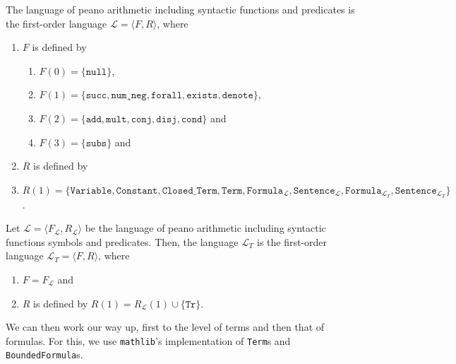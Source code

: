 \begin{definition}\label{def:l}
    \leanok
    The language of peano arithmetic including syntactic functions and predicates is the first-order language $\mathcal{L} = \langle F, R \rangle$, where
    \begin{enumerate}
        \item $F$ is defined by
        \begin{enumerate}
            \item $F(0) = \{\texttt{null}\}$,
            \item $F(1) = \{\texttt{succ},\texttt{num}¸\texttt{neg},\texttt{forall},\texttt{exists},\texttt{denote}\}$,
            \item $F(2) = \{\texttt{add},\texttt{mult},\texttt{conj},\texttt{disj},\texttt{cond}\}$ and
            \item $F(3) = \{\texttt{subs}\}$ and 
        \end{enumerate}
        \item $R$ is defined by \item $R(1) = \{\texttt{Variable},\texttt{Constant},\texttt{Closed\_Term},\texttt{Term},\texttt{Formula}_{\mathcal{L}}, \texttt{Sentence}_{\mathcal{L}},\texttt{Formula}_{\mathcal{L}_T},\texttt{Sentence}_{\mathcal{L}_T}\}$.
    \end{enumerate}
\end{definition} 

\begin{definition}\label{def:lt}
    \leanok
    Let $\mathcal{L} = \langle F_{\mathcal{L}},R_{\mathcal{L}} \rangle$ be the language of peano arithmetic including syntactic functions symbols and predicates. Then, the language $\mathcal{L}_T$ is the first-order language $\mathcal{L}_T = \langle F, R \rangle$, where
    \begin{enumerate}
        \item $F = F_{\mathcal{L}}$ and
        \item $R$ is defined by $R(1) = R_{\mathcal{L}}(1) \cup \{\texttt{Tr}\}$.
    \end{enumerate}
\end{definition}

We can then work our way up, first to the level of terms and then that of formulas. For this, we use \texttt{mathlib}'s implementation of \texttt{Term}s and \texttt{BoundedFormula}s. 

